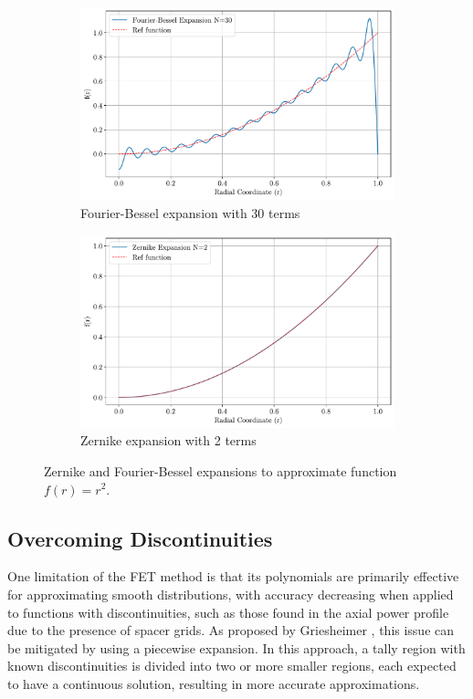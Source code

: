 \begin{figure}
    \centering
    \begin{subfigure}[b]{0.48\textwidth}
        \centering
        \includegraphics[width=\textwidth]{figs/bessel_exp_30.pdf}
        \caption{Fourier-Bessel expansion with 30 terms}
    \end{subfigure}
    \hspace{1em}
    \begin{subfigure}[b]{0.48\textwidth}
        \centering
        \includegraphics[width=\textwidth]{figs/zernike_2b.pdf}
        \caption{Zernike expansion with 2 terms}
    \end{subfigure}
    \caption{Zernike and Fourier-Bessel expansions to approximate function $f(r)=r^2$.}
    \label{fig_z}
\end{figure}

\subsection{Overcoming Discontinuities} \label{sec22x}
One limitation of the FET method is that its polynomials are primarily effective for approximating smooth distributions, with accuracy decreasing when applied to functions with discontinuities, such as those found in the axial power profile due to the presence of spacer grids. As proposed by Griesheimer \cite{gries}, this issue can be mitigated by using a piecewise expansion. In this approach, a tally region with known discontinuities is divided into two or more smaller regions, each expected to have a continuous solution, resulting in more accurate approximations.

